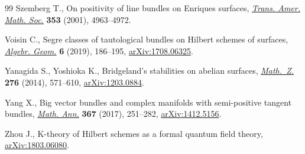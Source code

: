 \documentclass[10pt,a4paper]{amsart}
\numberwithin{equation}{section}
\begin{document}
\begin{thebibliography}{99}
Szemberg T., On positivity of line bundles on {E}nriques surfaces,
 \href{https://doi.org/10.1090/S0002-9947-01-02788-X}{\textit{Trans. Amer. Math. Soc.}} \textbf{353} (2001), 4963--4972.

Voisin C., Segre classes of tautological bundles on {H}ilbert schemes of
 surfaces, \href{https://doi.org/10.14231/AG-2019-010}{\textit{Algebr. Geom.}} \textbf{6} (2019), 186--195,
 \href{https://arxiv.org/abs/1708.06325}{arXiv:1708.06325}.

Yanagida S., Yoshioka K., Bridgeland's stabilities on abelian surfaces,
 \href{https://doi.org/10.1007/s00209-013-1214-1}{\textit{Math.~Z.}} \textbf{276} (2014), 571--610, \href{https://arxiv.org/abs/1203.0884}{arXiv:1203.0884}.

Yang X., Big vector bundles and complex manifolds with semi-positive tangent
 bundles, \href{https://doi.org/10.1007/s00208-016-1382-5}{\textit{Math. Ann.}} \textbf{367} (2017), 251--282,
 \href{https://arxiv.org/abs/1412.5156}{arXiv:1412.5156}.

Zhou J., K-theory of Hilbert schemes as a formal quantum field theory,
 \href{https://arxiv.org/abs/1803.06080}{arXiv:1803.06080}.

\end{thebibliography}
\end{document}
